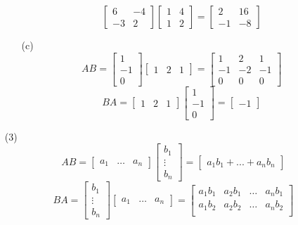 \documentclass[12pt]{article}
\begin{document}
\begin{itemize}
\begin{itemize}
$$\begin{bmatrix}
6 & -4 \\
-3 & 2
\end{bmatrix}\begin{bmatrix}
1 & 4 \\
1 & 2
\end{bmatrix} = \begin{bmatrix}
2 & 16 \\
-1 & -8
\end{bmatrix}$$
\item[(c)]
$$AB = \begin{bmatrix}
1 \\
-1 \\
0
\end{bmatrix}\begin{bmatrix}
1 & 2 & 1
\end{bmatrix} = \begin{bmatrix}
1 & 2 & 1 \\
-1 & -2 & -1 \\
0 & 0 & 0
\end{bmatrix}$$
$$BA = \begin{bmatrix}
1 & 2 & 1
\end{bmatrix}\begin{bmatrix}
1 \\
-1 \\
0
\end{bmatrix} = \begin{bmatrix}
-1
\end{bmatrix}$$
\end{itemize}
\item[(3)]
$$AB = \begin{bmatrix}
a_1 & \hdots & a_n
\end{bmatrix}\begin{bmatrix}
b_1 \\
\vdots \\
b_n
\end{bmatrix} = \begin{bmatrix}
a_1b_1 + ... + a_nb_n
\end{bmatrix}$$
$$BA = \begin{bmatrix}
b_1 \\
\vdots \\
b_n
\end{bmatrix}\begin{bmatrix}
a_1 & \hdots & a_n
\end{bmatrix} = \begin{bmatrix}
a_1b_1 & a_2b_1 & \hdots & a_nb_1 \\
a_1b_2 & a_2b_2 & \hdots & a_nb_2 \\

\end{bmatrix}$$
\end{itemize}
\end{document}
